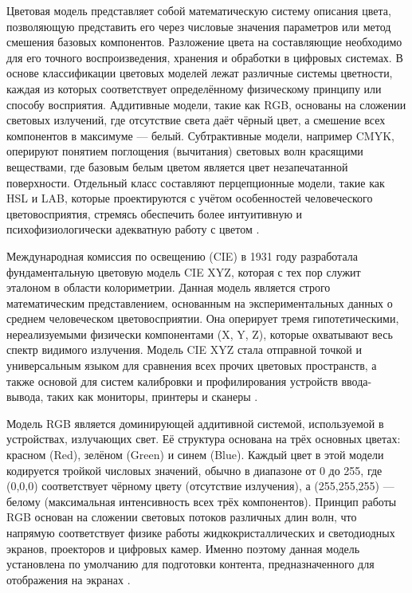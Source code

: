 \documentclass{SibFU-docs}
\begin{document}
Цветовая модель представляет собой математическую систему описания цвета, позволяющую представить его через числовые значения параметров или метод смешения базовых компонентов. Разложение цвета на составляющие необходимо для его точного воспроизведения, хранения и обработки в цифровых системах. В основе классификации цветовых моделей лежат различные системы цветности, каждая из которых соответствует определённому физическому принципу или способу восприятия. Аддитивные модели, такие как RGB, основаны на сложении световых излучений, где отсутствие света даёт чёрный цвет, а смешение всех компонентов в максимуме — белый. Субтрактивные модели, например CMYK, оперируют понятием поглощения (вычитания) световых волн красящими веществами, где базовым белым цветом является цвет незапечатанной поверхности. Отдельный класс составляют перцепционные модели, такие как HSL и LAB, которые проектируются с учётом особенностей человеческого цветовосприятия, стремясь обеспечить более интуитивную и психофизиологически адекватную работу с цветом \cite{colorimetry2020}.


Международная комиссия по освещению (CIE) в 1931 году разработала фундаментальную цветовую модель CIE XYZ, которая с тех пор служит эталоном в области колориметрии. Данная модель является строго математическим представлением, основанным на экспериментальных данных о среднем человеческом цветовосприятии. Она оперирует тремя гипотетическими, нереализуемыми физически компонентами (X, Y, Z), которые охватывают весь спектр видимого излучения. Модель CIE XYZ стала отправной точкой и универсальным языком для сравнения всех прочих цветовых пространств, а также основой для систем калибровки и профилирования устройств ввода-вывода, таких как мониторы, принтеры и сканеры \cite{colorimetry2020}.


Модель RGB является доминирующей аддитивной системой, используемой в устройствах, излучающих свет. Её структура основана на трёх основных цветах: красном (Red), зелёном (Green) и синем (Blue). Каждый цвет в этой модели кодируется тройкой числовых значений, обычно в диапазоне от 0 до 255, где (0,0,0) соответствует чёрному цвету (отсутствие излучения), а (255,255,255) — белому (максимальная интенсивность всех трёх компонентов). Принцип работы RGB основан на сложении световых потоков различных длин волн, что напрямую соответствует физике работы жидкокристаллических и светодиодных экранов, проекторов и цифровых камер. Именно поэтому данная модель установлена по умолчанию для подготовки контента, предназначенного для отображения на экранах \cite{rgb2022}.
\end{document}
